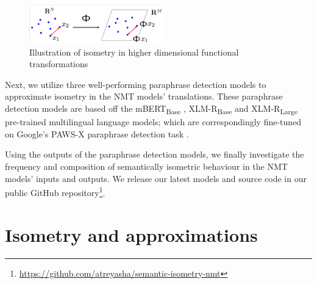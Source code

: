 \documentclass[11pt,a4paper]{article}
\begin{document}
\begin{figure}
  \centering
  \includegraphics[trim={1.0cm 0cm 0cm 1.0cm},clip,width=0.52\textwidth]{isometry_visualized.png}
  \caption{Illustration of isometry in higher dimensional functional transformations \citep{Hegde-Numax}}
  \label{isometry_visual}
\end{figure}

Next, we utilize three well-performing paraphrase detection models to approximate isometry in the NMT models' translations. These paraphrase detection models are based off the mBERT\textsubscript{Base} \cite{devlin-etal-2019-bert}, XLM-R\textsubscript{Base} \cite{conneau2019unsupervised} and XLM-R\textsubscript{Large} \cite{conneau2019unsupervised} pre-trained multilingual language models; which are correspondingly fine-tuned on Google's PAWS-X paraphrase detection task \cite{pawsx2019emnlp, hu2020xtreme}.
 
Using the outputs of the paraphrase detection models, we finally investigate the frequency and composition of semantically isometric behaviour in the NMT models' inputs and outputs. We release our latest models and source code in our public GitHub repository\footnote{\url{https://github.com/atreyasha/semantic-isometry-nmt}}.


\section{Isometry and approximations}
\end{document}

